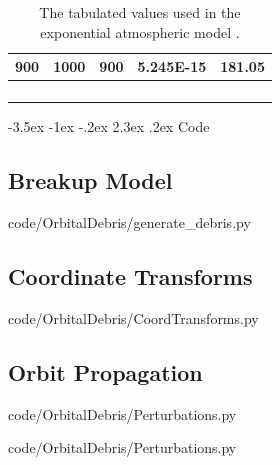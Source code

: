 \documentclass[a4paper, 12pt]{article}
\makeatletter
\renewcommand\section{\clearpage\newpage\@startsection {section}{1}{\z@}%
	{-3.5ex \@plus -1ex \@minus -.2ex}%
	{2.3ex \@plus.2ex}%
	{\normalfont\Large\bfseries}}
\makeatother
\begin{document}
\begin{appendices}
\begin{table}[h!]
{\begin{tabular}{lllll}
		900                       & 1000                      & 900                & 5.245E-15                                 & 181.05            \\ \hline
		&                           &                    &                                           &                   \\
		&                           &                    &                                           &                   \\
		&                           &                    &                                           &                   \\
		&                           &                    &                                           &                  
	\end{tabular}
	}
\caption{The tabulated values used in the exponential atmospheric model \citep{vallado_d._2013}.}
\label{atm}
\end{table}

\section{Code}

\subsection{Breakup Model}
\label{subsec:breakup}


{code/OrbitalDebris/generate_debris.py}

\subsection{Coordinate Transforms}
\label{subsec:transform}

{code/OrbitalDebris/CoordTransforms.py}

\subsection{Orbit Propagation}
\label{subsec:propagation}

{code/OrbitalDebris/Perturbations.py}



{code/OrbitalDebris/Perturbations.py}

	
	
\end{appendices}
\end{document}

